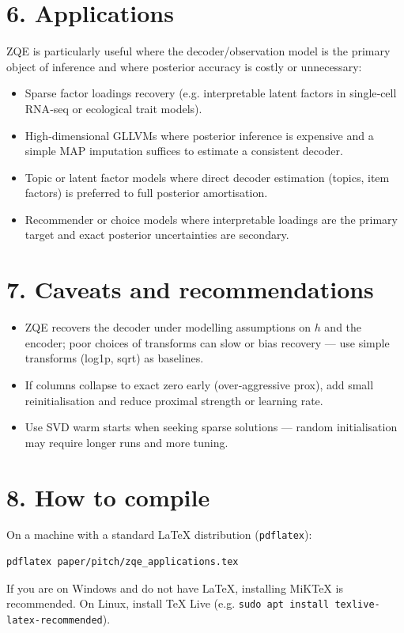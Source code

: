 \documentclass[11pt]{article}
\begin{document}
\section*{6. Applications}
ZQE is particularly useful where the decoder/observation model is the primary
object of inference and where posterior accuracy is costly or unnecessary:
\begin{itemize}
  \item Sparse factor loadings recovery (e.g. interpretable latent factors in
    single‑cell RNA‑seq or ecological trait models).
  \item High‑dimensional GLLVMs where posterior inference is expensive and a
    simple MAP imputation suffices to estimate a consistent decoder.
  \item Topic or latent factor models where direct decoder estimation (topics,
    item factors) is preferred to full posterior amortisation.
  \item Recommender or choice models where interpretable loadings are the
    primary target and exact posterior uncertainties are secondary.
\end{itemize}

\section*{7. Caveats and recommendations}
\begin{itemize}
  \item ZQE recovers the decoder under modelling assumptions on $h$ and the
    encoder; poor choices of transforms can slow or bias recovery — use simple
    transforms (log1p, sqrt) as baselines.
  \item If columns collapse to exact zero early (over‑aggressive prox), add
    small reinitialisation and reduce proximal strength or learning rate.
  \item Use SVD warm starts when seeking sparse solutions — random initialisation
    may require longer runs and more tuning.
\end{itemize}

\section*{8. How to compile}
On a machine with a standard LaTeX distribution (\texttt{pdflatex}):
\begin{verbatim}
pdflatex paper/pitch/zqe_applications.tex
\end{verbatim}
If you are on Windows and do not have LaTeX, installing MiKTeX is recommended.
On Linux, install TeX Live (e.g. \texttt{sudo apt install texlive-latex-recommended}).
\end{document}
